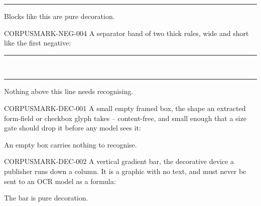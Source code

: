\documentclass[11pt,a4paper]{article}
\begin{document}
\noindent\textcolor{black!70}{\rule{22mm}{22mm}}

Blocks like this are pure decoration.

CORPUSMARK-NEG-004 A separator band of two thick rules, wide and short like the first negative:

\noindent\textcolor{black!30}{\rule{\linewidth}{4mm}}\\[2mm]
\noindent\textcolor{black!30}{\rule{\linewidth}{4mm}}

Nothing above this line needs recognising.

CORPUSMARK-DEC-001 A small empty framed box, the shape an extracted form-field or checkbox glyph
takes -- content-free, and small enough that a size gate should drop it before any model sees it:

\begin{center}
\end{center}

An empty box carries nothing to recognise.

CORPUSMARK-DEC-002 A vertical gradient bar, the decorative device a publisher runs down a column.
It is a graphic with no text, and must never be sent to an OCR model as a formula:

\begin{center}
\end{center}

The bar is pure decoration.
\end{document}
